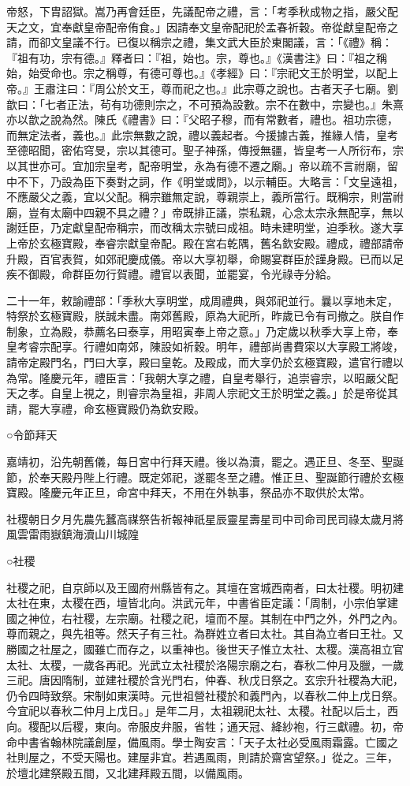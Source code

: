 帝怒，下胄詔獄。嵩乃再會廷臣，先議配帝之禮，言：「考季秋成物之指，嚴父配天之文，宜奉獻皇帝配帝侑食。」因請奉文皇帝配祀於孟春祈穀。帝從獻皇配帝之請，而卻文皇議不行。已復以稱宗之禮，集文武大臣於東閣議，言：「《禮》稱：『祖有功，宗有德。』釋者曰：『祖，始也。宗，尊也。』《漢書注》曰：『祖之稱始，始受命也。宗之稱尊，有德可尊也。』《孝經》曰：『宗祀文王於明堂，以配上帝。』王肅注曰：『周公於文王，尊而祀之也。』此宗尊之說也。古者天子七廟。劉歆曰：「七者正法，茍有功德則宗之，不可預為設數。宗不在數中，宗變也。』朱熹亦以歆之說為然。陳氏《禮書》曰：『父昭子穆，而有常數者，禮也。祖功宗德，而無定法者，義也。』此宗無數之說，禮以義起者。今援據古義，推緣人情，皇考至德昭聞，密佑穹旻，宗以其德可。聖子神孫，傳授無疆，皆皇考一人所衍布，宗以其世亦可。宜加宗皇考，配帝明堂，永為有德不遷之廟。」帝以疏不言祔廟，留中不下，乃設為臣下奏對之詞，作《明堂或問》，以示輔臣。大略言：「文皇遠祖，不應嚴父之義，宜以父配。稱宗雖無定說，尊親崇上，義所當行。既稱宗，則當祔廟，豈有太廟中四親不具之禮？」帝既排正議，崇私親，心念太宗永無配享，無以謝廷臣，乃定獻皇配帝稱宗，而改稱太宗號曰成祖。時未建明堂，迫季秋。遂大享上帝於玄極寶殿，奉睿宗獻皇帝配。殿在宮右乾隅，舊名欽安殿。禮成，禮部請帝升殿，百官表賀，如郊祀慶成儀。帝以大享初舉，命賜宴群臣於謹身殿。已而以足疾不御殿，命群臣勿行賀禮。禮官以表聞，並罷宴，令光祿寺分給。

二十一年，敕諭禮部：「季秋大享明堂，成周禮典，與郊祀並行。曩以享地未定，特祭於玄極寶殿，朕誠未盡。南郊舊殿，原為大祀所，昨歲已令有司撤之。朕自作制象，立為殿，恭薦名曰泰享，用昭寅奉上帝之意。」乃定歲以秋季大享上帝，奉皇考睿宗配享。行禮如南郊，陳設如祈穀。明年，禮部尚書費寀以大享殿工將竣，請帝定殿門名，門曰大享，殿曰皇乾。及殿成，而大享仍於玄極寶殿，遣官行禮以為常。隆慶元年，禮臣言：「我朝大享之禮，自皇考舉行，追崇睿宗，以昭嚴父配天之孝。自皇上視之，則睿宗為皇祖，非周人宗祀文王於明堂之義。」於是帝從其請，罷大享禮，命玄極寶殿仍為欽安殿。

○令節拜天

嘉靖初，沿先朝舊儀，每日宮中行拜天禮。後以為瀆，罷之。遇正旦、冬至、聖誕節，於奉天殿丹陛上行禮。既定郊祀，遂罷冬至之禮。惟正旦、聖誕節行禮於玄極寶殿。隆慶元年正旦，命宮中拜天，不用在外執事，祭品亦不取供於太常。

社稷朝日夕月先農先蠶高禖祭告祈報神祇星辰靈星壽星司中司命司民司祿太歲月將風雲雷雨嶽鎮海瀆山川城隍

○社稷

社稷之祀，自京師以及王國府州縣皆有之。其壇在宮城西南者，曰太社稷。明初建太社在東，太稷在西，壇皆北向。洪武元年，中書省臣定議：「周制，小宗伯掌建國之神位，右社稷，左宗廟。社稷之祀，壇而不屋。其制在中門之外，外門之內。尊而親之，與先祖等。然天子有三社。為群姓立者曰太社。其自為立者曰王社。又勝國之社屋之，國雖亡而存之，以重神也。後世天子惟立太社、太稷。漢高祖立官太社、太稷，一歲各再祀。光武立太社稷於洛陽宗廟之右，春秋二仲月及臘，一歲三祀。唐因隋制，並建社稷於含光門右，仲春、秋戊日祭之。玄宗升社稷為大祀，仍令四時致祭。宋制如東漢時。元世祖營社稷於和義門內，以春秋二仲上戊日祭。今宜祀以春秋二仲月上戊日。」是年二月，太祖親祀太社、太稷。社配以后土，西向。稷配以后稷，東向。帝服皮弁服，省牲；通天冠、絳紗袍，行三獻禮。初，帝命中書省翰林院議創屋，備風雨。學士陶安言：「天子太社必受風雨霜露。亡國之社則屋之，不受天陽也。建屋非宜。若遇風雨，則請於齋宮望祭。」從之。三年，於壇北建祭殿五間，又北建拜殿五間，以備風雨。

